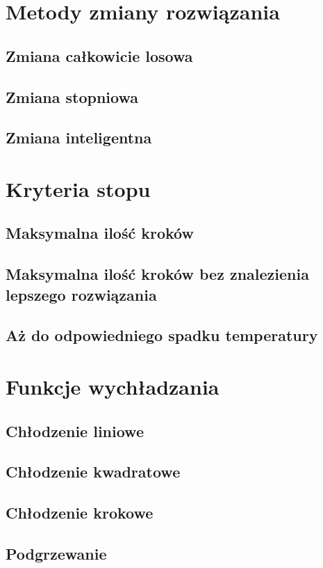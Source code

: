 \section{Metody zmiany rozwiązania}
\subsection{Zmiana całkowicie losowa}
\subsection{Zmiana stopniowa}
\subsection{Zmiana inteligentna}

\section{Kryteria stopu}
\subsection{Maksymalna ilość kroków}
\subsection{Maksymalna ilość kroków bez znalezienia lepszego rozwiązania}
\subsection{Aż do odpowiedniego spadku temperatury}

\section{Funkcje wychładzania}
\subsection{Chłodzenie liniowe}
\subsection{Chłodzenie kwadratowe}
\subsection{Chłodzenie krokowe}
\subsection{Podgrzewanie}

